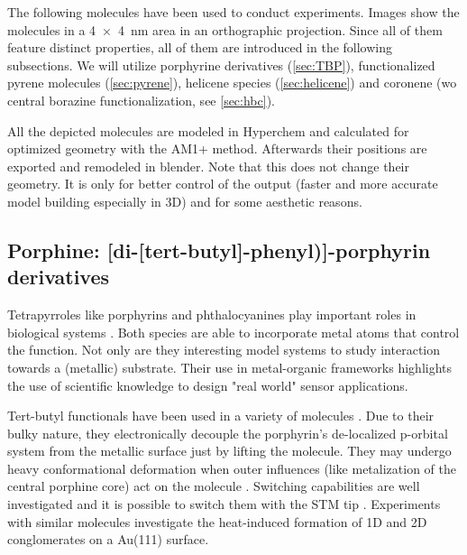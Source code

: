 \label{chapter:used-molecules}
The following molecules have been used to conduct experiments. Images show the molecules in a \SI{4x4}{\nano \meter} area in an orthographic projection. Since all of them feature distinct properties, all of them are introduced in the following subsections. We will utilize porphyrine derivatives (\autoref{sec:TBP}), functionalized pyrene molecules (\autoref{sec:pyrene}), helicene species (\autoref{sec:helicene}) and coronene (w\/o central borazine functionalization, see \autoref{sec:hbc}).

All the depicted molecules are modeled in Hyperchem\cite{_hyperchemtm_1111} and calculated for optimized geometry with the AM1+ method. Afterwards their positions are exported and remodeled in blender. Note that this does not change their geometry. It is only for better control of the output (faster and more accurate model building especially in 3D) and for some aesthetic reasons.

\subsection{Porphine: [di-[tert-butyl]-phenyl)]-porphyrin derivatives}
\label{sec:TBP}
Tetrapyrroles like porphyrins and phthalocyanines play important roles in biological systems \cite{battersby_tetrapyrroles_2000}. Both species are able to incorporate metal atoms that control the function. Not only are they interesting model systems to study interaction towards a (metallic) substrate\cite{auwarter_porphyrins_2015, auwarter_controlled_2007, diller_vacuo_2016}. Their use in metal-organic frameworks highlights the use of scientific knowledge to design "real world" sensor applications\cite{Lustig_Metal-organic_2017}. 


Tert-butyl functionals have been used in a variety of molecules \cite{moresco_conformational_2001}. Due to their bulky nature, they electronically decouple the porphyrin’s de-localized p-orbital system from the metallic surface just by lifting the molecule. They may undergo heavy conformational deformation when outer influences (like metalization of the central porphine core) act on the molecule \cite{stark_massive_2014}. Switching capabilities are well investigated \cite{loppacher_direct_2003} and it is possible to switch them with the STM tip \cite{ditze_energetics_2014}. Experiments with similar molecules investigate the heat-induced formation of 1D and 2D conglomerates on a Au(111) surface.\cite{pham_heat-induced_2015}

